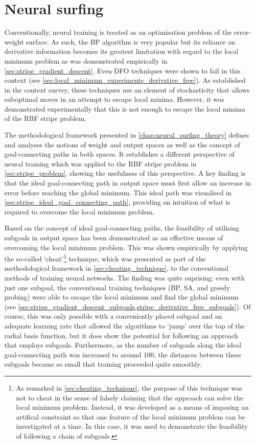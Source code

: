 \section{Neural surfing}
\label{sec:eval_neural_surfing}
Conventionally, neural training is treated as an optimisation problem of the error-weight surface.
As such, the BP algorithm is very popular but its reliance on derivative information becomes its greatest limitation with regard to the local minimum problem as was demonstrated empirically in \ref{sec:stripe_gradient_descent}.
Even DFO techniques were shown to fail in this context (see \ref{sec:local_minimum_experiments_derivative_free}).
As established in the context survey, these techniques use an element of stochasticity that allows suboptimal moves in an attempt to escape local minima.
However, it was demonstrated experimentally that this is not enough to escape the local minima of the RBF stripe problem.

The methodological framework presented in \ref{chap:neural_surfing_theory} defines and analyses the notions of weight and output spaces as well as the concept of goal-connecting paths in both spaces.
It establishes a different perspective of neural training which was applied to the RBF stripe problem in \ref{sec:stripe_problem}, showing the usefulness of this perspective.
A key finding is that the ideal goal-connecting path in output space must first allow an increase in error before reaching the global minimum.
This ideal path was visualised in \ref{sec:stripe_ideal_goal_connecting_path}, providing an intuition of what is required to overcome the local minimum problem.

Based on the concept of ideal goal-connecting paths, the feasibility of utilising subgoals in output space has been demonstrated as an effective means of overcoming the local minimum problem.
This was shown empirically by applying the so-called `cheat'\footnote{As remarked in \ref{sec:cheating_technique}, the purpose of this technique was not to cheat in the sense of falsely claiming that the approach can solve the local minimum problem. Instead, it was developed as a means of imposing an artifical constraint so that one feature of the local minimum problem can be investigated at a time. In this case, it was used to demonstrate the feasibility of following a chain of subgoals.} technique, which was presented as part of the methodological framework in \ref{sec:cheating_technique}, to the conventional methods of training neural networks.
The finding was quite suprising: even with just one subgoal, the conventional training techniques (BP, SA, and greedy probing) were able to escape the local minimum and find the global minimum (see \ref{sec:stripe_gradient_descent_subgoals,stripe_derivative_free_subgoals}).
Of course, this was only possible with a conveniently placed subgoal and an adequate learning rate that allowed the algorithms to `jump' over the top of the radial basis function, but it does show the potential for following an approach that employs subgoals.
Furthermore, as the number of subgoals along the ideal goal-connecting path was increased to around 100, the distances between these subgoals became so small that training proceeded quite smoothly.

